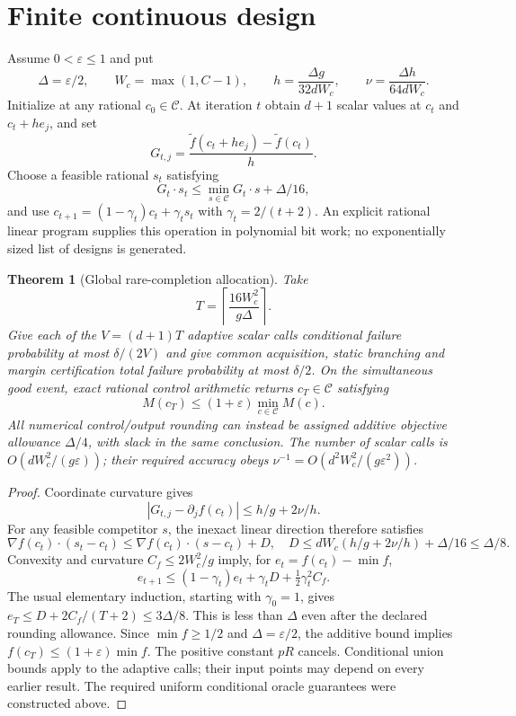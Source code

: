 \documentclass[11pt]{article}
\newtheorem{theorem}{Theorem}
\newcommand{\calC}{\mathcal C}
\begin{document}
\section{Finite continuous design}
\label{sec:optimization}
Assume $0<\varepsilon\le1$ and put
\[
 \Delta=\varepsilon/2,\qquad W_c=\max(1,C-1),\qquad
 h=\frac{\Delta g}{32dW_c},\qquad
 \nu=\frac{\Delta h}{64dW_c}.
\]
Initialize at any rational $c_0\in\calC$. At iteration $t$ obtain
$d+1$ scalar values at $c_t$ and $c_t+he_j$, and set
\[
 G_{t,j}=\frac{\widetilde f(c_t+he_j)-\widetilde f(c_t)}h.
\]
Choose a feasible rational $s_t$ satisfying
\[
 G_t\cdot s_t\le\min_{s\in\calC}G_t\cdot s+\Delta/16,
\]
and use $c_{t+1}=(1-\gamma_t)c_t+\gamma_t s_t$ with
$\gamma_t=2/(t+2)$. An explicit rational linear program supplies this
operation in polynomial bit work; no exponentially sized list of designs
is generated.

\begin{theorem}[Global rare-completion allocation]
Take
\[
 T=\left\lceil\frac{16W_c^2}{g\Delta}\right\rceil.
\]
Give each of the $V=(d+1)T$ adaptive scalar calls conditional failure
probability at most $\delta/(2V)$ and give common acquisition, static
branching and margin certification total failure probability at most
$\delta/2$. On the simultaneous good event, exact rational control
arithmetic returns $c_T\in\calC$ satisfying
\[
 M(c_T)\le(1+\varepsilon)\min_{c\in\calC}M(c).
 \label{eq:global}
\]
All numerical control/output rounding can instead be assigned additive
objective allowance $\Delta/4$, with slack in the same conclusion.
The number of scalar calls is
$O(dW_c^2/(g\varepsilon))$; their required accuracy obeys
$\nu^{-1}=O(d^2W_c^2/(g\varepsilon^2))$.
\end{theorem}
\begin{proof}
Coordinate curvature gives
\[
 |G_{t,j}-\partial_jf(c_t)|\le h/g+2\nu/h.
\]
For any feasible competitor $s$, the inexact linear direction therefore
satisfies
\[
 \nabla f(c_t)\cdot(s_t-c_t)
 \le\nabla f(c_t)\cdot(s-c_t)+D,
\quad D\le dW_c(h/g+2\nu/h)+\Delta/16\le\Delta/8.
\]
Convexity and curvature $C_f\le2W_c^2/g$ imply, for
$e_t=f(c_t)-\min f$,
\[
 e_{t+1}\le(1-\gamma_t)e_t+\gamma_tD+
                 \tfrac12\gamma_t^2C_f.
\]
The usual elementary induction, starting with $\gamma_0=1$, gives
$e_T\le D+2C_f/(T+2)\le3\Delta/8$. This is less than $\Delta$ even
after the declared rounding allowance. Since $\min f\ge1/2$ and
$\Delta=\varepsilon/2$, the additive bound implies
$f(c_T)\le(1+\varepsilon)\min f$. The positive constant $pR$ cancels.
Conditional union bounds apply to the adaptive calls; their input points
may depend on every earlier result. The required uniform conditional
oracle guarantees were constructed above.
\end{proof}
\end{document}
